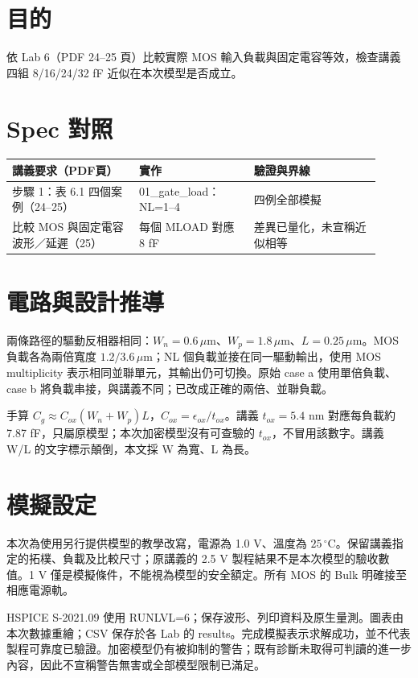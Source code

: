 \section{目的}
依 Lab 6（PDF 24--25 頁）比較實際 MOS 輸入負載與固定電容等效，檢查講義四組 8/16/24/32 fF 近似在本次模型是否成立。

\section{Spec 對照}
\begin{longtable}{p{0.31\linewidth}p{0.29\linewidth}p{0.31\linewidth}}
\toprule
講義要求（PDF頁） & 實作 & 驗證與界線 \\\midrule
步驟 1：表 6.1 四個案例（24--25） & 01\_gate\_load：NL=1--4 & 四例全部模擬 \\
比較 MOS 與固定電容波形／延遲（25） & 每個 MLOAD 對應 8 fF & 差異已量化，未宣稱近似相等 \\
\bottomrule
\end{longtable}


\section{電路與設計推導}
兩條路徑的驅動反相器相同：$W_n=0.6\,\mu$m、$W_p=1.8\,\mu$m、$L=0.25\,\mu$m。MOS 負載各為兩倍寬度 $1.2/3.6\,\mu$m；NL 個負載並接在同一驅動輸出，使用 MOS multiplicity 表示相同並聯單元，其輸出仍可切換。原始 case a 使用單倍負載、case b 將負載串接，與講義不同；已改成正確的兩倍、並聯負載。

手算 $C_g\approx C_{ox}(W_n+W_p)L$，$C_{ox}=\epsilon_{ox}/t_{ox}$。講義 $t_{ox}=5.4$ nm 對應每負載約 7.87 fF，只屬原模型；本次加密模型沒有可查驗的 $t_{ox}$，不冒用該數字。講義 W/L 的文字標示顛倒，本文採 W 為寬、L 為長。

\section{模擬設定}
本次為使用另行提供模型的教學改寫，電源為 1.0 V、溫度為 $25\,^{\circ}\mathrm C$。保留講義指定的拓樸、負載及比較尺寸；原講義的 2.5 V 製程結果不是本次模型的驗收數值。1 V 僅是模擬條件，不能視為模型的安全額定。所有 MOS 的 Bulk 明確接至相應電源軌。

HSPICE S-2021.09 使用 RUNLVL=6；保存波形、列印資料及原生量測。圖表由本次數據重繪；CSV 保存於各 Lab 的 results。完成模擬表示求解成功，並不代表製程可靠度已驗證。加密模型仍有被抑制的警告；既有診斷未取得可判讀的進一步內容，因此不宣稱警告無害或全部模型限制已滿足。

